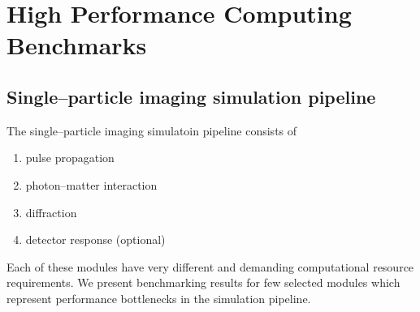 \documentclass[10pt]{scrartcl}
\begin{document}
\section{High Performance Computing Benchmarks}
\subsection{Single--particle imaging simulation pipeline}
The single--particle imaging simulatoin pipeline consists of
\begin{enumerate}
  \item pulse propagation
  \item photon--matter interaction
  \item diffraction
  \item detector response (optional)
\end{enumerate}

Each of these modules have very different and demanding computational resource
requirements. We present benchmarking results for few selected modules which
represent performance bottlenecks in the simulation pipeline.
\end{document}
